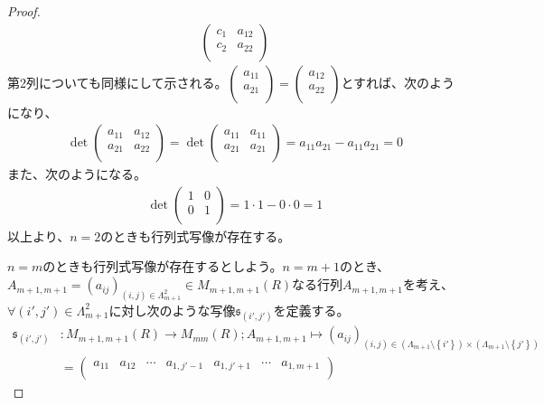 \documentclass[dvipdfmx]{jsarticle}
\begin{document}
\begin{proof}
\begin{align*}
\begin{pmatrix}
c_{1} & a_{12} \\
c_{2} & a_{22} \\
\end{pmatrix}
\end{align*}
第2列についても同様にして示される。$\begin{pmatrix}
a_{11} \\
a_{21} \\
\end{pmatrix} = \begin{pmatrix}
a_{12} \\
a_{22} \\
\end{pmatrix}$とすれば、次のようになり、
\begin{align*}
\det\begin{pmatrix}
a_{11} & a_{12} \\
a_{21} & a_{22} \\
\end{pmatrix} = \det\begin{pmatrix}
a_{11} & a_{11} \\
a_{21} & a_{21} \\
\end{pmatrix} = a_{11}a_{21} - a_{11}a_{21} = 0
\end{align*}
また、次のようになる。
\begin{align*}
\det\begin{pmatrix}
1 & 0 \\
0 & 1 \\
\end{pmatrix} = 1 \cdot 1 - 0 \cdot 0 = 1
\end{align*}
以上より、$n = 2$のときも行列式写像が存在する。\par
$n = m$のときも行列式写像が存在するとしよう。$n = m + 1$のとき、$A_{m + 1,m + 1} = \left( a_{ij} \right)_{(i,j) \in \varLambda_{m + 1}^{2}} \in M_{m + 1,m + 1}(R)$なる行列$A_{m + 1,m + 1}$を考え、$\forall\left( i',j' \right) \in \varLambda_{m + 1}^{2}$に対し次のような写像$\mathfrak{s}_{\left( i',j' \right)}$を定義する。
\begin{align*}
\mathfrak{s}_{\left( i',j' \right)}&:M_{m + 1,m + 1}(R) \rightarrow M_{mm}(R);A_{m + 1,m + 1} \mapsto \left( a_{ij} \right)_{(i,j) \in \left( \varLambda_{m + 1} \setminus \left\{ i' \right\} \right) \times \left( \varLambda_{m + 1} \setminus \left\{ j' \right\} \right)} \\
&= \begin{pmatrix}
a_{11} & a_{12} & \cdots & a_{1,j' - 1} & a_{1,j' + 1} & \cdots & a_{1,m + 1} \\

\end{pmatrix}
\end{align*}
\end{proof}
\end{document}
